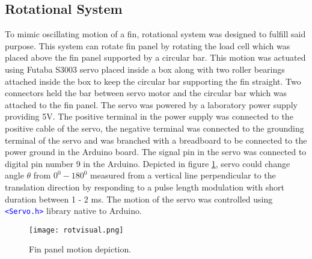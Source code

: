 \subsection{Rotational System}
\label{sec:rotate}
To mimic oscillating motion of a fin, rotational system was designed to fulfill said purpose. This system can rotate fin panel by rotating the load cell which was placed above the fin panel supported by a circular bar. This motion was actuated using Futaba S3003 servo placed inside a box along with two roller bearings attached inside the box to keep the circular bar supporting the fin straight. Two connectors held the bar between servo motor and the circular bar which was attached to the fin panel. The servo was powered by a laboratory power supply providing 5V. The positive terminal in the power supply was connected to the positive cable of the servo, the negative terminal was connected to the grounding terminal of the servo and was branched with a breadboard to be connected to the power ground in the Arduino board. The signal pin in the servo was connected to digital pin number 9 in the Arduino. Depicted in figure \ref{fig:rotvisual}, servo could change angle $\theta$ from $0^{0} - 180^{0}$ measured from a vertical line perpendicular to the translation direction by responding to a pulse length modulation with short duration between 1 - 2 ms. The motion of the servo was controlled using \texttt{\textcolor{blue}{<Servo.h>}} library native to Arduino.
\begin{figure}[H]
    \centering
    \texttt{[image: rotvisual.png]}
    \caption{Fin panel motion depiction.}
    \label{fig:rotvisual}
\end{figure}
